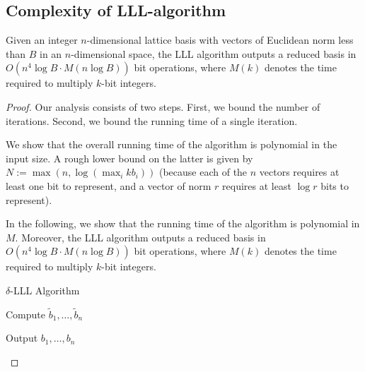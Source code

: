 \subsection{Complexity of LLL-algorithm}
\begin{theorem}
    Given an integer $n$-dimensional lattice basis with vectors of Euclidean norm less than $B$ in an $n$-dimensional space, the LLL algorithm outputs a reduced basis in $O(n^4 \log B \cdot M(n \log B))$ bit operations, where $M(k)$ denotes the time required to multiply $k$-bit integers.
\end{theorem}
\begin{proof}
    Our analysis consists of two steps. First, we bound the number of iterations. Second, we bound the running time of a single iteration.

We show that the overall running time of the algorithm is polynomial in the input size. A rough lower bound on the latter is given by $N := \max(n, \log(\max_i kb_i))$ (because each of the $n$ vectors requires at least one bit to represent, and a vector of norm $r$ requires at least $\log r$ bits to represent).

In the following, we show that the running time of the algorithm is polynomial in $M$. Moreover, the LLL algorithm outputs a reduced basis in $O(n^4 \log B \cdot M(n \log B))$ bit operations, where $M(k)$ denotes the time required to multiply $k$-bit integers.
\begin{algorithm}
    \caption{$\delta$-LLL Algorithm}
    \label{alg:delta-LLL}
    
    
    \BlankLine
    Compute $\tilde{b}_1, \ldots, \tilde{b}_n$\;
    
    \BlankLine
    
    \BlankLine
    Output $b_1, \ldots, b_n$
    \end{algorithm}


\end{proof}
